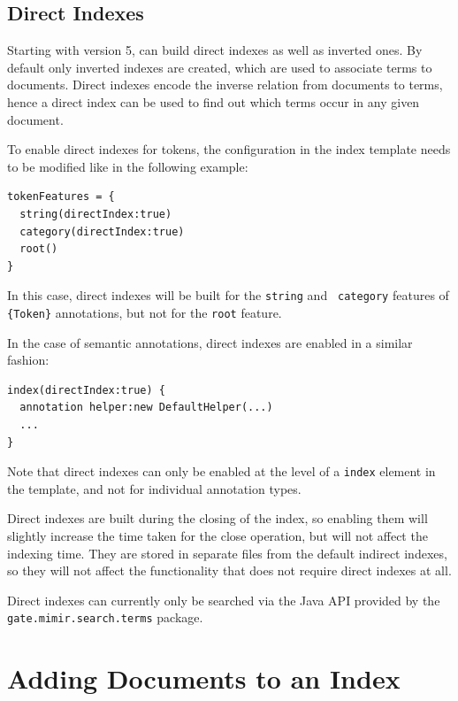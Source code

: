 \subsection*{Direct Indexes}
\label{sec:direct-indexes}
Starting with version 5, \Mimir{} can build direct indexes as well as inverted
ones. By default only inverted indexes are created, which are used to associate
terms to documents. Direct indexes encode the inverse relation from documents to
terms, hence a direct index can be used to find out which terms occur in any
given document.

To enable direct indexes for tokens, the configuration in the index template
needs to be modified like in the following example:
\begin{lstlisting}
tokenFeatures = {
  string(directIndex:true)
  category(directIndex:true)
  root()
}
\end{lstlisting}

In this case, direct indexes will be built for the {\tt string} and {\tt
category} features of \verb!{Token}! annotations, but not for the {\tt root}
feature.

In the case of semantic annotations, direct indexes are enabled in a similar
fashion:
\begin{lstlisting}
index(directIndex:true) {
  annotation helper:new DefaultHelper(...)
  ...
}
\end{lstlisting}

Note that direct indexes can only be enabled at the level of a {\tt index}
element in the template, and not for individual annotation types.

Direct indexes are built during the closing of the index, so enabling them will
slightly increase the time taken for the close operation, but will not affect
the indexing time. They are stored in separate files from the default indirect
indexes, so they will not affect the functionality that does not require direct
indexes at all.

Direct indexes can currently only be searched via the Java API provided by the
{\tt gate.mimir.search.terms} package.

\section{Adding Documents to an Index}\label{sec:indexing:add-docs}

